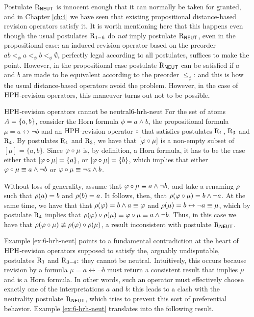 Postulate $\mathrm{R}_{\mathsf{NEUT}}$ is innocent enough that it can normally be taken 
for granted, and in Chapter \ref{ch:4} we have seen that 
existing propositional distance-based revision operators satisfy it.
It is worth mentioning here that this happens even though
the usual postulates $\mathrm{R}_{1-6}$ do \emph{not} 
imply postulate $\mathrm{R}_{\mathsf{NEUT}}$, even in the propositional case:
an induced revision operator based on the 
preorder $ab<_\phi a <_\phi b <_\phi \emptyset$, 
perfectly legal according to all postulates, suffices to make the point.
However, in the propositional case postulate $\mathrm{R}_{\mathsf{NEUT}}$ can be satisfied 
if $a$ and $b$ are made to be equivalent according to the preorder $\le_\phi$:
and this is how the usual distance-based operators avoid the problem.
However, in the case of ${\mathrm{HPH}}$-revision operators,
this maneuver turns out not to be possible.

\begin{xmpl}{${\mathrm{HPH}}$-revision operators cannot be neutral}{6-hrh-neut}
	For the set of atoms $A = \{a,b\}$,
	consider the Horn formula $\phi=a\land b$, 
	the propositional formula $\mu=a\leftrightarrow \lnot b$
	and an ${\mathrm{HPH}}$-revision operator $\circ$
	that satisfies postulates $\mathrm{R}_{1}$, $\mathrm{R}_{3}$ and $\mathrm{R}_{4}$.
	By postulates $\mathrm{R}_{1}$ and $\mathrm{R}_{3}$, 
	we have that $[\varphi\circ \mu]$ is a non-empty
	subset of $[\mu]=\{a,b\}$.
	Since $\varphi\circ\mu$ is, by definition, a Horn formula,
	it has to be the case 
	either that $[\varphi\circ\mu]=\{a\}$,
	or $[\varphi\circ\mu]=\{b\}$,
	which implies that either $\varphi\circ\mu\equiv a\land\lnot b$
	or $\varphi\circ\mu\equiv\lnot a\land b$.

	Without loss of generality, assume that 
	$\varphi\circ\mu\equiv a\land\lnot b$,
	and take a renaming $\rho$
	such that
	$\rho(a)=b$
	and $\rho(b)=a$.
	It follows, then, that $\rho(\varphi\circ\mu)=b\land\lnot a$.
	At the same time, we have that
	that $\rho(\varphi)=b\land a\equiv \varphi$
	and $\rho(\mu)=b\leftrightarrow \lnot a\equiv \mu$,
	which by postulate $\mathrm{R}_{4}$ implies that
	$\rho(\varphi)\circ\rho(\mu)\equiv\varphi\circ\mu\equiv a\land\lnot b$.
	Thus, in this case we have that 
	$\rho(\varphi\circ\mu)\not\equiv\rho(\varphi)\circ\rho(\mu)$,
	a result inconsistent with postulate $\mathrm{R}_{\mathsf{NEUT}}$.
\end{xmpl}

Example \ref{ex:6-hrh-neut} points to a fundamental
contradiction at the heart of ${\mathrm{HPH}}$-revision operators 
supposed to satisfy the, arguably undisputable,
postulates $\mathrm{R}_{1}$ and $\mathrm{R}_{3-4}$:
they cannot be neutral.
Intuitively, this occurs because revision by a formula 
$\mu=a\leftrightarrow\lnot b$
must return a consistent result that implies $\mu$
and is a Horn formula.
In other words,
such an operator must effectively choose exactly
one of the interpretations $a$ and $b$:
this leads to a clash with the neutrality postulate $\mathrm{R}_{\mathsf{NEUT}}$,
which tries to prevent this sort of preferential behavior.
Example \ref{ex:6-hrh-neut} translates into the following result.

